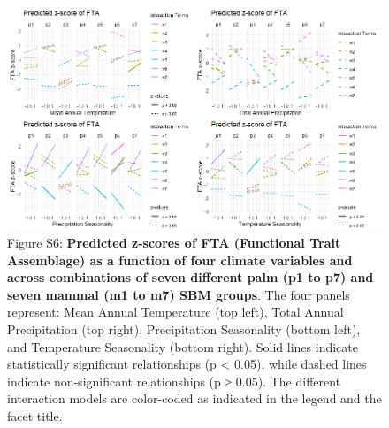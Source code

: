\documentclass[
]{agujournal2019}
\begin{document}
\begin{figure}[H]

{\centering \includegraphics{Sup_figures/00_climate_effects.png}

}

\caption{Figure S6: \textbf{Predicted z-scores of FTA (Functional Trait
Assemblage) as a function of four climate variables and across
combinations of seven different palm (p1 to p7) and seven mammal (m1 to
m7) SBM groups}. The four panels represent: Mean Annual Temperature (top
left), Total Annual Precipitation (top right), Precipitation Seasonality
(bottom left), and Temperature Seasonality (bottom right). Solid lines
indicate statistically significant relationships (p \textless{} 0.05),
while dashed lines indicate non-significant relationships (p ≥ 0.05).
The different interaction models are color-coded as indicated in the
legend and the facet title.}

\end{figure}%
\end{document}
